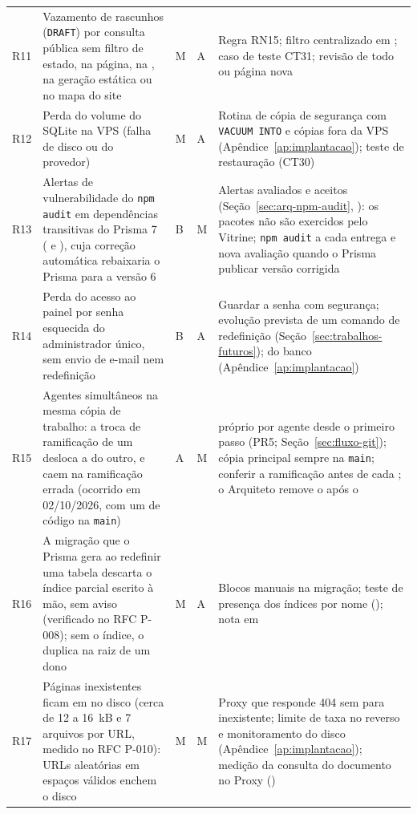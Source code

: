 \begin{longtable}{@{}L{1.0cm}L{5.0cm}L{0.7cm}L{0.7cm}L{6.9cm}@{}}
R11 & Vazamento de rascunhos (\texttt{DRAFT}) por consulta pública sem filtro de estado, na página, na , na geração estática ou no mapa do site & M & A & Regra RN15; filtro centralizado em ; caso de teste CT31; revisão de todo  ou página nova\\
R12 & Perda do volume do SQLite na VPS (falha de disco ou do provedor) & M & A & Rotina de cópia de segurança com \texttt{VACUUM INTO} e cópias fora da VPS (Apêndice~\ref{ap:implantacao}); teste de restauração (CT30)\\
R13 & Alertas de vulnerabilidade do \texttt{npm audit} em dependências transitivas do Prisma 7 ( e ), cuja correção automática rebaixaria o Prisma para a versão 6 & B & M & Alertas avaliados e aceitos (Seção~\ref{sec:arq-npm-audit}, ): os pacotes não são exercidos pelo Vitrine; \texttt{npm audit} a cada entrega e nova avaliação quando o Prisma publicar versão corrigida\\
R14 & Perda do acesso ao painel por senha esquecida do administrador único, sem envio de e-mail nem redefinição & B & A & Guardar a senha com segurança; evolução prevista de um comando de redefinição (Seção~\ref{sec:trabalhos-futuros});  do banco (Apêndice~\ref{ap:implantacao})\\
R15 & Agentes simultâneos na mesma cópia de trabalho: a troca de ramificação de um desloca a do outro, e  caem na ramificação errada (ocorrido em 02/10/2026, com um  de código na \texttt{main}) & A & M &  próprio por agente desde o primeiro passo (PR5; Seção~\ref{sec:fluxo-git}); cópia principal sempre na \texttt{main}; conferir a ramificação antes de cada ; o Arquiteto remove o  após o \\
R16 & A migração que o Prisma gera ao redefinir uma tabela descarta o índice parcial escrito à mão, sem aviso (verificado no RFC P-008); sem o índice, o  duplica na raiz de um dono & M & A & Blocos manuais na migração; teste de presença dos índices por nome (); nota em \\
R17 & Páginas inexistentes ficam em  no disco (cerca de 12 a 16~kB e 7 arquivos por URL, medido no RFC P-010): URLs aleatórias em espaços válidos enchem o disco & M & M & Proxy que responde 404 sem  para  inexistente; limite de taxa no  reverso e monitoramento do disco (Apêndice~\ref{ap:implantacao}); medição da consulta do documento no Proxy ()\\

\end{longtable}
